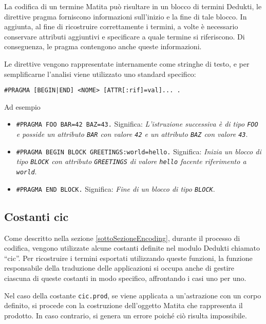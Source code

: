 \documentclass[12pt,a4paper]{mimosis}
\begin{document}
La codifica di un termine Matita può risultare in un blocco di termini Dedukti,
le direttive pragma forniscono informazioni sull'inizio e la fine di tale blocco.
In aggiunta, al fine di ricostruire correttamente i termini, a volte è necessario
conservare attributi aggiuntivi e specificare a quale termine si riferiscono.
Di conseguenza, le pragma contengono anche queste informazioni.

Le direttive vengono rappresentate internamente come stringhe di testo, e per
semplificarne l'analisi viene utilizzato uno standard specifico:
\begin{center}
  \texttt{\#PRAGMA [BEGIN|END] <NOME> [ATTR[:rif]=val]... .}
\end{center}

Ad esempio
\begin{itemize}
  \item  \texttt{\#PRAGMA FOO BAR=42 BAZ=43.} Significa: \textit{L'istruzione successiva è di tipo
    \texttt{FOO} e posside un attributo \texttt{BAR} con valore \texttt{42} e 
    un attributo \texttt{BAZ} con valore \texttt{43}}.

  \item  \texttt{\#PRAGMA BEGIN BLOCK GREETINGS:world=hello.} Significa: \textit{
    Inizia un blocco di tipo \texttt{BLOCK} con attributo \texttt{GREETINGS} di 
    valore \texttt{hello} facente riferimento a \texttt{world}}.

  \item  \texttt{\#PRAGMA END BLOCK.} Significa: \textit{Fine di un blocco di tipo
    \texttt{BLOCK}}.
\end{itemize}

\subsection{Costanti cic}
Come descritto nella sezione \ref{sottoSezioneEncoding}, durante il processo di
codifica, vengono utilizzate alcune costanti definite nel modulo Dedukti chiamato
``cic''. Per ricostruire i termini esportati utilizzando queste funzioni, la funzione
responsabile della traduzione delle applicazioni si occupa anche di gestire ciascuna
di queste costanti in modo specifico, affrontando i casi uno per uno. 

Nel caso della
costante \texttt{cic.prod}, se viene applicata a un'astrazione con un corpo definito,
si procede con la costruzione dell'oggetto Matita che rappresenta il prodotto. In caso
contrario, si genera un errore poiché ciò risulta impossibile.
\end{document}

